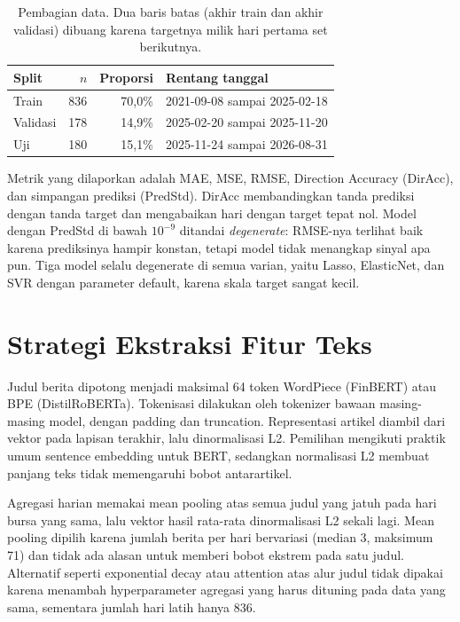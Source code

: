 \documentclass[10pt,a4paper]{article}
\newcommand{\feat}[1]{\texttt{\detokenize{#1}}}
\begin{document}
\begin{table}[h]
\centering\small
\caption{Pembagian data. Dua baris batas (akhir train dan akhir validasi) dibuang karena targetnya milik hari pertama set berikutnya.}
\label{tab:split}
\begin{tabular}{lrrl}
\toprule
Split & $n$ & Proporsi & Rentang tanggal \\
\midrule
Train & 836 & 70,0\% & 2021-09-08 sampai 2025-02-18 \\
Validasi & 178 & 14,9\% & 2025-02-20 sampai 2025-11-20 \\
Uji & 180 & 15,1\% & 2025-11-24 sampai 2026-08-31 \\
\bottomrule
\end{tabular}
\end{table}

Metrik yang dilaporkan adalah MAE, MSE, RMSE, Direction Accuracy (DirAcc), dan simpangan prediksi (PredStd). DirAcc membandingkan tanda prediksi dengan tanda target dan mengabaikan hari dengan target tepat nol. Model dengan PredStd di bawah \(10^{-9}\) ditandai \emph{degenerate}: RMSE-nya terlihat baik karena prediksinya hampir konstan, tetapi model tidak menangkap sinyal apa pun. Tiga model selalu degenerate di semua varian, yaitu Lasso, ElasticNet, dan SVR dengan parameter default, karena skala target sangat kecil.

\section{Strategi Ekstraksi Fitur Teks}
Judul berita dipotong menjadi maksimal 64 token WordPiece (FinBERT) atau BPE (DistilRoBERTa). Tokenisasi dilakukan oleh tokenizer bawaan masing-masing model, dengan padding dan truncation. Representasi artikel diambil dari vektor \feat{[CLS]} pada lapisan terakhir, lalu dinormalisasi L2. Pemilihan \feat{[CLS]} mengikuti praktik umum sentence embedding untuk BERT, sedangkan normalisasi L2 membuat panjang teks tidak memengaruhi bobot antarartikel.

Agregasi harian memakai mean pooling atas semua judul yang jatuh pada hari bursa yang sama, lalu vektor hasil rata-rata dinormalisasi L2 sekali lagi. Mean pooling dipilih karena jumlah berita per hari bervariasi (median 3, maksimum 71) dan tidak ada alasan untuk memberi bobot ekstrem pada satu judul. Alternatif seperti exponential decay atau attention atas alur judul tidak dipakai karena menambah hyperparameter agregasi yang harus dituning pada data yang sama, sementara jumlah hari latih hanya 836.
\end{document}
